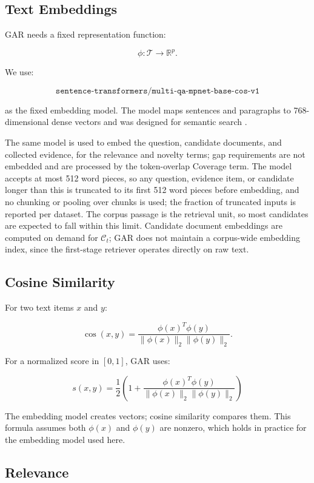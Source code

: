 \documentclass[11pt,a4paper]{article}
\begin{document}
\subsection{Text Embeddings}

GAR needs a fixed representation function:

\[
\phi:\mathcal{T}\rightarrow\mathbb{R}^{p}.
\]

We use:

\[
\boxed{
\texttt{sentence-transformers/multi-qa-mpnet-base-cos-v1}
}
\]

as the fixed embedding model. The model maps sentences and paragraphs to 768-dimensional dense vectors and was designed for semantic search \citep{reimers-gurevych-2019-sentence,multiqa-mpnet}.

The same model is used to embed the question, candidate documents, and collected evidence, for the relevance and novelty terms; gap requirements are not embedded and are processed by the token-overlap Coverage term. The model accepts at most 512 word pieces, so any question, evidence item, or candidate longer than this is truncated to its first 512 word pieces before embedding, and no chunking or pooling over chunks is used; the fraction of truncated inputs is reported per dataset. The corpus passage is the retrieval unit, so most candidates are expected to fall within this limit. Candidate document embeddings are computed on demand for $\mathcal{C}_t$; GAR does not maintain a corpus-wide embedding index, since the first-stage retriever operates directly on raw text.

\subsection{Cosine Similarity}

For two text items $x$ and $y$:

\[
\operatorname{cos}(x,y)
=
\frac{\phi(x)^T\phi(y)}
{\|\phi(x)\|_2\|\phi(y)\|_2}.
\]

For a normalized score in $[0,1]$, GAR uses:

\[
\boxed{
s(x,y)
=
\frac{1}{2}
\left(
1+
\frac{\phi(x)^T\phi(y)}
{\|\phi(x)\|_2\|\phi(y)\|_2}
\right)
}
\tag{1}
\]

The embedding model creates vectors; cosine similarity compares them. This formula assumes both $\phi(x)$ and $\phi(y)$ are nonzero, which holds in practice for the embedding model used here.

\subsection{Relevance}
\end{document}

